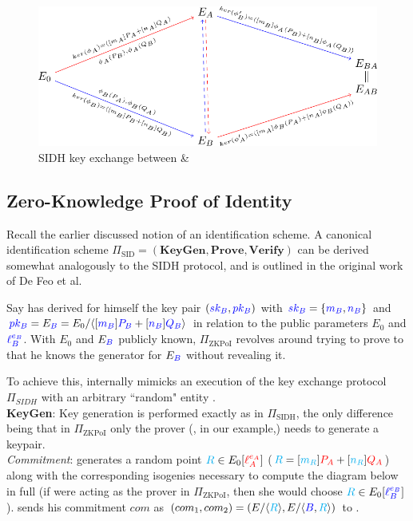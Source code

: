 \begin{figure}[htb]
\centering
\includegraphics[scale=0.5]{keyexchange.png} %
\caption{SIDH key exchange between \alice \& \bob}
\label{fig:kex} %
\end{figure}

\subsection{Zero-Knowledge Proof of Identity}

Recall the earlier discussed notion of an identification scheme. A canonical identification scheme $\Pi_{\text{SID}} = (\textbf{KeyGen},\textbf{Prove},\textbf{Verify})$ can be derived somewhat analogously to the SIDH protocol, and is outlined in the original work of De Feo et al.

Say \bob has derived for himself the key pair $(\textcolor{blue}{sk_B},\textcolor{blue}{pk_B})$ with $\textcolor{blue}{sk_B} = \{\textcolor{blue}{m_B},\textcolor{blue}{n_B}\}$ and $\textcolor{blue}{pk_B} = E_{\textcolor{blue}{B}} = E_0/\langle [\textcolor{blue}{m_B}]\textcolor{blue}{P_B} + [\textcolor{blue}{n_B}]\textcolor{blue}{Q_B} \rangle$ in relation to the public parameters $E_0$ and $\textcolor{blue}{\ell_{B}^{e_B}}$. With $E_0$ and $E_{\textcolor{blue}{B}}$ publicly known, $\Pi_{\text{ZKPoI}}$ revolves around \bob trying to prove to \alice that he knows the generator for $E_{\textcolor{blue}{B}}$ without revealing it.

To achieve this, \bob internally mimicks an execution of the key exchange protocol $\Pi_{SIDH}$ with an arbitrary ``random" entity \randall.\\

\noindent
\textbf{KeyGen}: Key generation is performed exactly as in $\Pi_{\text{SIDH}}$, the only difference being that in $\Pi_{\text{ZKPoI}}$ only the prover (\bob, in our example,) needs to generate a keypair.\\

\noindent
\emph{Commitment}: \bob generates a random point $\textcolor{cyan}{R} \in E_0[\textcolor{red}{\ell_{A}^{e_A}}]$ ($\textcolor{cyan}{R} = [\textcolor{cyan}{m_R}]\textcolor{red}{P_A} + [\textcolor{cyan}{n_R}]\textcolor{red}{Q_A}$) along with the corresponding isogenies necessary to compute the diagram below in full (if \alice were acting as the prover in $\Pi_{\text{ZKPoI}}$, then she would choose $\textcolor{cyan}{R} \in E_0[\textcolor{blue}{\ell_{B}^{e_B}}]$). \bob sends his commitment $com$ as $(com_1,com_2) = (E/\langle \textcolor{cyan}{R} \rangle, E/\langle \textcolor{blue}{B}, \textcolor{cyan}{R} \rangle)$ to \alice.\\

